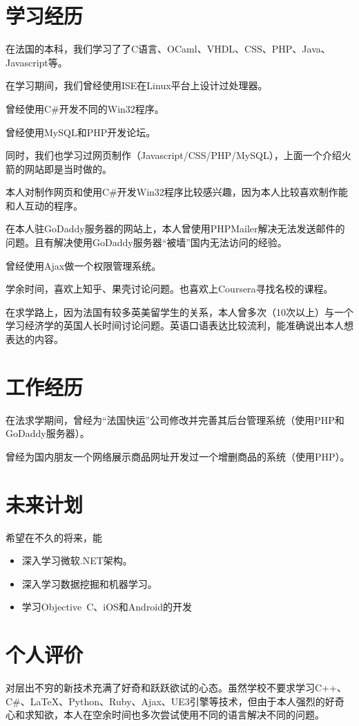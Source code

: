 \documentclass[UTF8]{ctexart}
\begin{document}
\section{学习经历}
在法国的本科，我们学习了了C语言、OCaml、VHDL、CSS、PHP、Java、Javascript等。

在学习期间，我们曾经使用ISE在Linux平台上设计过处理器。

曾经使用C\#{}开发不同的Win32程序。

曾经使用MySQL和PHP开发论坛。

同时，我们也学习过网页制作（Javascript/CSS/PHP/MySQL），上面一个介绍火箭的网站即是当时做的。

本人对制作网页和使用C\#{}开发Win32程序比较感兴趣，因为本人比较喜欢制作能和人互动的程序。

在本人驻GoDaddy服务器的网站上，本人曾使用PHPMailer解决无法发送邮件的问题。且有解决使用GoDaddy服务器“被墙”国内无法访问的经验。

曾经使用Ajax做一个权限管理系统。

学余时间，喜欢上知乎、果壳讨论问题。也喜欢上Coursera寻找名校的课程。

在求学路上，因为法国有较多英美留学生的关系，本人曾多次（10次以上）与一个学习经济学的英国人长时间讨论问题。英语口语表达比较流利，能准确说出本人想表达的内容。
\section{工作经历}
在法求学期间，曾经为“法国快运”公司修改并完善其后台管理系统（使用PHP和GoDaddy服务器）。

曾经为国内朋友一个网络展示商品网址开发过一个增删商品的系统（使用PHP）。
\section{未来计划}
希望在不久的将来，能
\begin{itemize}
\item 深入学习微软.NET架构。
\item 深入学习数据挖掘和机器学习。
\item 学习Objective\ C、iOS和Android的开发
\end{itemize}
\section{个人评价}
对层出不穷的新技术充满了好奇和跃跃欲试的心态。虽然学校不要求学习C++、C\#{}、\LaTeX{}、Python、Ruby、Ajax、UE3引擎等技术，但由于本人强烈的好奇心和求知欲，本人在空余时间也多次尝试使用不同的语言解决不同的问题。
\end{document}
